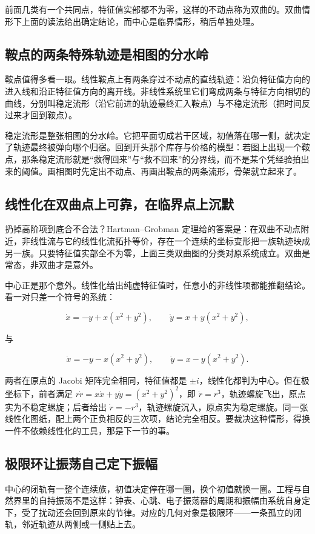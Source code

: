 前面几类有一个共同点，特征值实部都不为零，这样的不动点称为双曲的。双曲情形下上面的读法给出确定结论，而中心是临界情形，稍后单独处理。

\subsection{鞍点的两条特殊轨迹是相图的分水岭}

鞍点值得多看一眼。线性鞍点上有两条穿过不动点的直线轨迹：沿负特征值方向的进入线和沿正特征值方向的离开线。非线性系统里它们弯成两条与特征方向相切的曲线，分别叫稳定流形（沿它前进的轨迹最终汇入鞍点）与不稳定流形（把时间反过来才回到鞍点）。

稳定流形是整张相图的分水岭。它把平面切成若干区域，初值落在哪一侧，就决定了轨迹最终被弹向哪个归宿。回到开头那个库存与价格的模型：若图上出现一个鞍点，那条稳定流形就是``救得回来''与``救不回来''的分界线，而不是某个凭经验拍出来的阈值。画相图时先定出不动点、再画出鞍点的两条流形，骨架就立起来了。

\subsection{线性化在双曲点上可靠，在临界点上沉默}

扔掉高阶项到底合不合法？Hartman--Grobman 定理给的答案是：在双曲不动点附近，非线性流与它的线性化流拓扑等价，存在一个连续的坐标变形把一族轨迹映成另一族。只要特征值实部全不为零，上面三类双曲图的分类对原系统成立。双曲是常态，非双曲才是意外。

中心正是那个意外。线性化给出纯虚特征值时，任意小的非线性项都能推翻结论。看一对只差一个符号的系统：

\[
\dot x=-y+x(x^2+y^2),
\qquad
\dot y=x+y(x^2+y^2),
\]

与

\[
\dot x=-y-x(x^2+y^2),
\qquad
\dot y=x-y(x^2+y^2).
\]

两者在原点的 Jacobi 矩阵完全相同，特征值都是 \(\pm i\)，线性化都判为中心。但在极坐标下，前者满足 \(r\dot r=x\dot x+y\dot y=(x^2+y^2)^2\)，即 \(\dot r=r^3\)，轨迹螺旋飞出，原点实为不稳定螺旋；后者给出 \(\dot r=-r^3\)，轨迹螺旋沉入，原点实为稳定螺旋。同一张线性化图纸，配上两个正负相反的三次项，结论完全相反。要裁决这种情形，得换一件不依赖线性化的工具，那是下一节的事。

\subsection{极限环让振荡自己定下振幅}

中心的闭轨有一整个连续族，初值决定停在哪一圈，换个初值就换一圈。工程与自然界里的自持振荡不是这样：钟表、心跳、电子振荡器的周期和振幅由系统自身定下，受了扰动还会回到原来的节律。对应的几何对象是极限环——一条孤立的闭轨，邻近轨迹从两侧或一侧贴上去。

